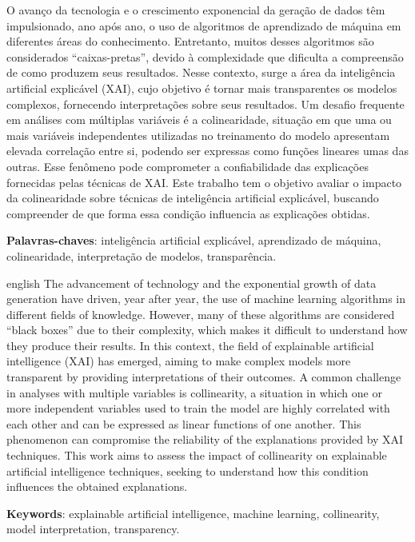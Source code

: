 
\setlength{\absparsep}{18pt} %
\begin{resumo}
 O avanço da tecnologia e o crescimento exponencial da geração de dados têm impulsionado, ano após ano, o uso de algoritmos de aprendizado de máquina em diferentes áreas do conhecimento. Entretanto, muitos desses algoritmos são considerados “caixas-pretas”, devido à complexidade que dificulta a compreensão de como produzem seus resultados. Nesse contexto, surge a área da inteligência artificial explicável (XAI), cujo objetivo é tornar mais transparentes os modelos complexos, fornecendo interpretações sobre seus resultados. Um desafio frequente em análises com múltiplas variáveis é a colinearidade, situação em que uma ou mais variáveis independentes utilizadas no treinamento do modelo apresentam elevada correlação entre si, podendo ser expressas como funções lineares umas das outras. Esse fenômeno pode comprometer a confiabilidade das explicações fornecidas pelas técnicas de XAI. Este trabalho tem o objetivo avaliar o impacto da colinearidade sobre técnicas de inteligência artificial explicável, buscando compreender de que forma essa condição influencia as explicações obtidas.


 \textbf{Palavras-chaves}: inteligência artificial explicável, aprendizado de máquina, colinearidade, interpretação de modelos, transparência.
\end{resumo}

\begin{resumo}[Abstract]
 \begin{otherlanguage*}{english}
   The advancement of technology and the exponential growth of data generation have driven, year after year, the use of machine learning algorithms in different fields of knowledge. However, many of these algorithms are considered “black boxes” due to their complexity, which makes it difficult to understand how they produce their results. In this context, the field of explainable artificial intelligence (XAI) has emerged, aiming to make complex models more transparent by providing interpretations of their outcomes. A common challenge in analyses with multiple variables is collinearity, a situation in which one or more independent variables used to train the model are highly correlated with each other and can be expressed as linear functions of one another. This phenomenon can compromise the reliability of the explanations provided by XAI techniques. This work aims to assess the impact of collinearity on explainable artificial intelligence techniques, seeking to understand how this condition influences the obtained explanations.

   \vspace{\onelineskip}
 
   \noindent 
   \textbf{Keywords}: explainable artificial intelligence, machine learning, collinearity, model interpretation, transparency.
 \end{otherlanguage*}
\end{resumo}